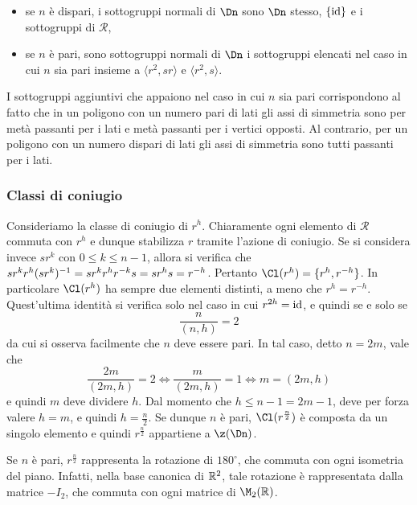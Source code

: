 \documentclass[11pt]{scrartcl}
\begin{document}
	\begin{itemize}
		\item se $n$ è dispari, i sottogruppi normali di $\Dn$ sono $\Dn$ stesso,
		$\{\mathrm{id} \}$ e i sottogruppi di $\mathcal{R}$,
		\item se $n$ è pari, sono sottogruppi normali di $\Dn$ i sottogruppi elencati
		nel caso in cui $n$ sia pari insieme a $\langle r^2, sr \rangle$ e $\langle r^2, s \rangle$.
	\end{itemize}
	
	\begin{remark}
		I sottogruppi aggiuntivi che appaiono nel caso in cui $n$ sia pari corrispondono
		al fatto 
		che in un poligono con un numero pari di lati gli assi di simmetria sono 
		per metà passanti per i lati e metà passanti per i vertici opposti. Al contrario,
		per un poligono con un numero dispari
		di lati gli assi di simmetria sono tutti passanti per i lati.
	\end{remark}
	
	
	\subsubsection{Classi di coniugio}

	Consideriamo la classe di coniugio di $r^h$. Chiaramente ogni elemento di
	$\mathcal{R}$ commuta con $r^h$ e dunque stabilizza $r$ tramite l'azione di
	coniugio. Se si considera invece $sr^k$ con $0 \leq k \leq n-1$, allora si
	verifica che
	$sr^k r^h (sr^k)^{-1} = sr^k r^h r^{-k} s = sr^hs = r^{-h}$. Pertanto
	$\Cl(r^h) = \{r^h, r^{-h}\}$. In particolare $\Cl(r^h)$ ha sempre due
	elementi distinti, a meno che $r^h = r^{-h}$. Quest'ultima identità si
	verifica solo nel caso in cui $r^{2h} = \mathrm{id}$, e quindi se e solo
	se
	\[ \frac{n}{(n, h)} = 2 \]
	da cui si osserva facilmente che $n$ deve essere pari. In tal caso, detto
	$n = 2m$, vale che
	\[ \frac{2m}{(2m, h)} = 2 \iff \frac{m}{(2m, h)} = 1 \iff m = (2m, h) \]
	e quindi $m$ deve dividere $h$. Dal momento che $h \leq n-1 = 2m -1$,
	deve per forza valere $h = m$, e quindi $h = \frac{n}{2}$. Se dunque
	$n$ è pari, $\Cl(r^{\frac{n}{2}})$ è composta da un singolo elemento
	e quindi $r^{\frac{n}{2}}$ appartiene a $\z(\Dn)$.
	
	\begin{remark}
		Se $n$ è pari, $r^{\frac{n}{2}}$ rappresenta la rotazione di $180^{\circ}$,
		che commuta con ogni isometria del piano. Infatti, nella base canonica
		di $\mathbb R^2$, tale rotazione è rappresentata dalla matrice $-I_2$, che
		commuta con ogni matrice di $\M_2(\RR)$.
	\end{remark}
	
\end{document}
